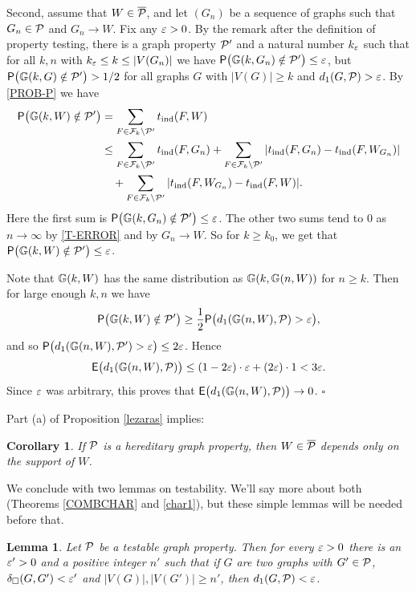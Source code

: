 \documentclass{article}
\newtheorem{lemma}[theorem]{Lemma}
\newtheorem{corollary}[theorem]{Corollary}
\newenvironment{proof}{\medskip\noindent{\bf Proof. }}{\hfill$\square$\medskip}
\begin{document}
\begin{proof}
Second, assume that $W\in\overline{\mathcal{P}}$, and let $(G_n)$ be a
sequence of graphs such that $G_n\in\mathcal{P}$ and $G_n\to W$. Fix any
$\varepsilon>0$. By the remark after the definition of property testing,
there is a graph property $\mathcal{P}'$ and a natural number $k_\varepsilon$ such
that for all $k,n$ with $k_\varepsilon\le k\le |V(G_n)|$ we have
${\sf P}\bigl({\mathbb G}(k,G_n)\notin\mathcal{P}'\bigr)\le \varepsilon$, but
${\sf P}\bigl({\mathbb G}(k,G)\notin\mathcal{P}'\bigr)> 1/2$ for all graphs $G$ with
$|V(G)|\ge k$ and $d_1(G,\mathcal{P})>\varepsilon$. By \eqref{PROB-P} we have
\begin{align*}
{\sf P}\bigl({\mathbb G}(k,W)\notin\mathcal{P}'\bigr)&= \sum_{F\in\mathcal{F}_k\setminus\mathcal{P}'} t_{\rm ind}(F,W)\\
&\le\sum_{F\in\mathcal{F}_k\setminus\mathcal{P}'}
t_{\rm ind}(F,G_n)+\sum_{F\in\mathcal{F}_k\setminus\mathcal{P}'}
|t_{\rm ind}(F,G_n)-t_{\rm ind}(F,W_{G_n})|\\
&~~~+\sum_{F\in\mathcal{F}_k\setminus\mathcal{P}'} |t_{\rm ind}(F,W_{G_n})-t_{\rm ind}(F,W)|.
\end{align*}
Here the first sum is ${\sf P}\bigl({\mathbb G}(k,G_n)\notin\mathcal{P}'\bigr)\le \varepsilon$.
The other two sums tend to $0$ as $n\to\infty$ by \eqref{T-ERROR} and
by $G_n\to W$. So for $k\ge k_0$, we get that
${\sf P}\bigl({\mathbb G}(k,W)\notin\mathcal{P}'\bigr)\le \varepsilon$.

Note that ${\mathbb G}(k,W)$ has the same distribution as ${\mathbb G}(k,{\mathbb G}(n,W))$
for $n\ge k$. Then for large enough $k,n$ we have
\[
{\sf P}\bigl({\mathbb G}(k,W)\notin\mathcal{P}'\bigr) \ge
\frac12{\sf P}\bigl(d_1({\mathbb G}(n,W),\mathcal{P})>\varepsilon\bigr),
\]
and so ${\sf P}\bigl(d_1({\mathbb G}(n,W),\mathcal{P}')>\varepsilon\bigr)\le 2\varepsilon$. Hence
\[
{\sf E}\bigl(d_1({\mathbb G}(n,W),\mathcal{P})\bigr) \le (1-2\varepsilon)\cdot\varepsilon + (2\varepsilon)\cdot
1 <3\varepsilon.
\]
Since $\varepsilon$ was arbitrary, this proves that
${\sf E}\bigl(d_1({\mathbb G}(n,W),\mathcal{P})\bigr) \to 0$.
\end{proof}

Part (a) of Proposition \ref{lezaras} implies:

\begin{corollary}\label{COR:HERED-SUPP}
If $\mathcal{P}$ is a hereditary graph property, then $W\in\overline{\mathcal{P}}$
depends only on the support of $W$.
\end{corollary}

We conclude with two lemmas on testability.  We'll say more about
both (Theorems \ref{COMBCHAR} and \ref{char1}), but these simple
lemmas will be needed before that.

\begin{lemma}\label{kozel2}
Let $\mathcal{P}$ be a testable graph property. Then for every $\varepsilon>0$ there
is an $\varepsilon'>0$ and a positive integer $n'$ such that if  $G$ are two
graphs with $G'\in\mathcal{P}$, $\delta_{\square}(G,G')<\varepsilon'$ and
$|V(G)|,|V(G')|\geq n'$, then $d_1(G,\mathcal{P})<\varepsilon$.
\end{lemma}
\end{document}
